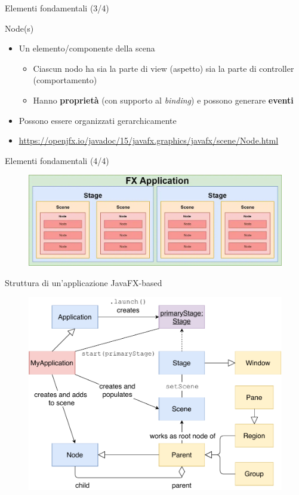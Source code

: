 \documentclass[xcolor=dvipsnames,presentation]{beamer}
\begin{document}
\begin{frame} {Elementi fondamentali (3/4)}
\begin{block}{Node(s)}
\begin{itemize}
\item Un elemento/componente della scena
\begin{itemize}
\item Ciascun nodo ha sia la parte di view (aspetto) sia la parte di controller (comportamento)
\item Hanno \textbf{proprietà} (con supporto al \emph{binding}) e possono generare \textbf{eventi}
\end{itemize}
\item Possono essere organizzati gerarchicamente
\item \url{https://openjfx.io/javadoc/15/javafx.graphics/javafx/scene/Node.html}
\end{itemize}
\end{block}
\end{frame}

\begin{frame}{Elementi fondamentali (4/4)}
\begin{figure}
\includegraphics[width=\textwidth]{img/javafx-app.png}
\end{figure}
\end{frame}

%

\begin{frame}{Struttura di un'applicazione JavaFX-based}
\begin{figure}
\includegraphics[height=0.86\textheight]{img/javafx-app-structure.pdf}
\end{figure}
\end{frame}
\end{document}
